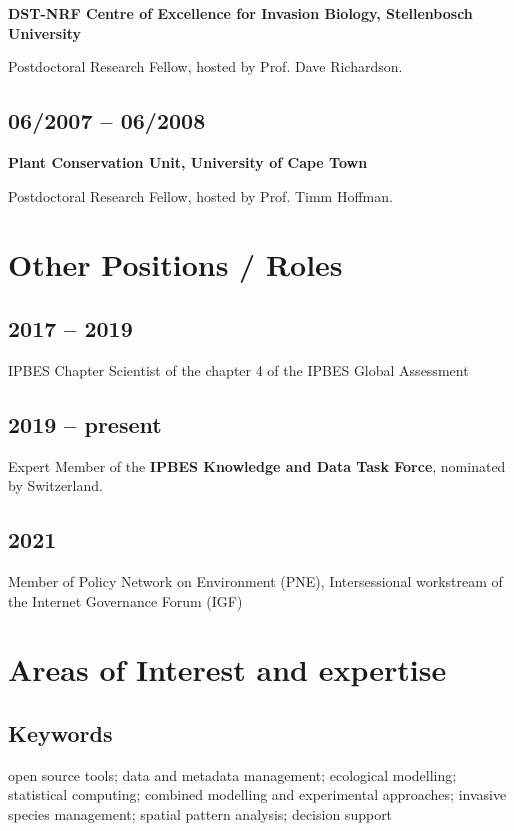 \documentclass[a4paper]{article}
\begin{document}
\textbf{DST-NRF Centre of Excellence for Invasion Biology, Stellenbosch University}

Postdoctoral Research Fellow, hosted by Prof. Dave Richardson.

\subsection{06/2007 -- 06/2008}

\textbf{Plant Conservation Unit, University of Cape Town} 

Postdoctoral Research Fellow, hosted by Prof. Timm Hoffman.

\section{Other Positions / Roles}

\subsection{2017 -- 2019}

IPBES Chapter Scientist of the chapter 4 of the IPBES Global Assessment

\subsection{2019 -- present}

Expert Member of the \textbf{IPBES Knowledge and Data Task Force}, nominated by Switzerland. 

\subsection{2021}

Member of Policy Network on Environment (PNE), Intersessional workstream of the Internet Governance Forum (IGF)

\section{Areas of Interest and expertise}

\subsection{Keywords}

open source tools; data and metadata management; ecological modelling; statistical computing; combined modelling and experimental approaches; invasive species management; spatial pattern analysis; decision support
\end{document}
